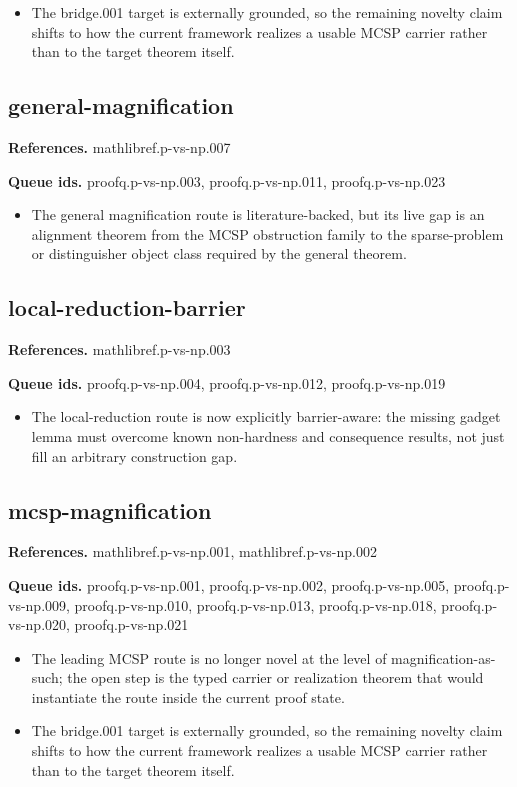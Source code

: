 \documentclass[11pt]{article}
\begin{document}
\begin{itemize}[leftmargin=*,itemsep=0.2em]
\item The bridge.001 target is externally grounded, so the remaining novelty claim shifts to how the current framework realizes a usable MCSP carrier rather than to the target theorem itself.
\end{itemize}
\subsection*{general-magnification}
\textbf{References.} mathlibref.p-vs-np.007

\textbf{Queue ids.} proofq.p-vs-np.003, proofq.p-vs-np.011, proofq.p-vs-np.023

\begin{itemize}[leftmargin=*,itemsep=0.2em]
\item The general magnification route is literature-backed, but its live gap is an alignment theorem from the MCSP obstruction family to the sparse-problem or distinguisher object class required by the general theorem.
\end{itemize}
\subsection*{local-reduction-barrier}
\textbf{References.} mathlibref.p-vs-np.003

\textbf{Queue ids.} proofq.p-vs-np.004, proofq.p-vs-np.012, proofq.p-vs-np.019

\begin{itemize}[leftmargin=*,itemsep=0.2em]
\item The local-reduction route is now explicitly barrier-aware: the missing gadget lemma must overcome known non-hardness and consequence results, not just fill an arbitrary construction gap.
\end{itemize}
\subsection*{mcsp-magnification}
\textbf{References.} mathlibref.p-vs-np.001, mathlibref.p-vs-np.002

\textbf{Queue ids.} proofq.p-vs-np.001, proofq.p-vs-np.002, proofq.p-vs-np.005, proofq.p-vs-np.009, proofq.p-vs-np.010, proofq.p-vs-np.013, proofq.p-vs-np.018, proofq.p-vs-np.020, proofq.p-vs-np.021

\begin{itemize}[leftmargin=*,itemsep=0.2em]
\item The leading MCSP route is no longer novel at the level of magnification-as-such; the open step is the typed carrier or realization theorem that would instantiate the route inside the current proof state.
\item The bridge.001 target is externally grounded, so the remaining novelty claim shifts to how the current framework realizes a usable MCSP carrier rather than to the target theorem itself.
\end{itemize}
\end{document}
